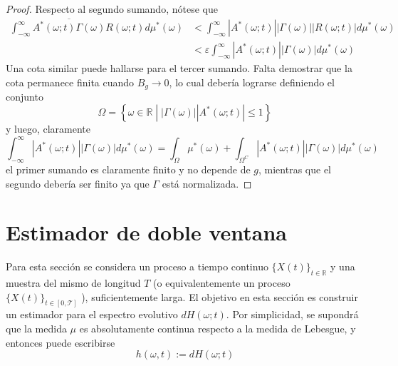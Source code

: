\documentclass[12pt,letterpaper]{book}
\newtheorem{proposicion}[teorema]{Proposición}
\newcommand{\R}{\mathbb{R}}
\newcommand{\intR}{\int_{-\infty}^{\infty}}
\newcommand{\abso}[1]{\left| #1 \right|}
\newcommand{\xt}{$\{X(t)\}_{t\in \mathcal{T}}$ }
\newcommand{\xtin}[1]{$\{X(t)\}_{t\in \mathcal{ #1 }}$ }
\newcommand{\talque}{\mathrel{}\middle|\mathrel{}}
\begin{document}
\begin{proof}
Respecto al segundo sumando, nótese que 
\begin{align*}
\intR \overline{A^{*}(\omega; t) \Gamma(\omega)} R(\omega; t) d\mu^{*}(\omega)
&< \intR \abso{A^{*}(\omega; t)} \abso{ \Gamma(\omega)} \abso{R(\omega; t)} d\mu^{*}(\omega) \\
&< \varepsilon \intR \abso{A^{*}(\omega; t)}\abso{ \Gamma(\omega)} d\mu^{*}(\omega)
\end{align*}
Una cota similar puede hallarse para el tercer sumando.
Falta demostrar que la cota permanece finita cuando $B_g \rightarrow 0$, lo cual debería lograrse definiendo el conjunto
\begin{equation}
\Omega = \left\{ \omega \in \R \talque \abso{\Gamma(\omega)} \abso{A^{*}(\omega; t)} \leq 1 \right\} 
\end{equation}
y luego, claramente
\begin{equation}
\intR \abso{A^{*}(\omega; t)}\abso{ \Gamma(\omega)} d\mu^{*}(\omega) = 
\int_\Omega \mu^{*}(\omega) + 
\int_{\Omega^{C}} \abso{A^{*}(\omega; t)}\abso{ \Gamma(\omega)} d\mu^{*}(\omega)
\end{equation}
el primer sumando es claramente finito y no depende de $g$, mientras que el segundo debería ser finito ya que $\Gamma$ está normalizada.
\end{proof}

%


\section{Estimador de doble ventana}
\label{sec:doble_ventana}

Para esta sección se considera un proceso a tiempo continuo \xtin{\R} y una muestra del mismo de longitud $T$ (o equivalentemente un proceso \xtin{[0,T]}), suficientemente larga. El objetivo en esta sección es construir un estimador para el espectro evolutivo $dH(\omega; t)$.
%
Por simplicidad, se supondrá que la medida $\mu$ es absolutamente continua respecto a la medida de Lebesgue, y entonces puede escribirse
\begin{equation}
h(\omega,t) := dH(\omega; t)
\end{equation}
\end{document}
